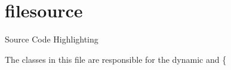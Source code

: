 \hypertarget{filesource-example}{\section{filesource}
}
\-Source \-Code \-Highlighting

\-The classes in this file are responsible for the dynamic and \{


\begin{DoxyCodeInclude}
\end{DoxyCodeInclude}
 